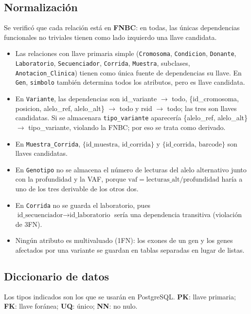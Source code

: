 \documentclass[11pt,a4paper]{article}
\newcommand{\tb}[1]{\texttt{#1}}
\begin{document}
\subsection{Normalización}
\label{sec:normalizacion}

Se verificó que cada relación está en \textbf{FNBC}: en todas, las únicas dependencias funcionales no triviales tienen como lado izquierdo una llave candidata.

\begin{itemize}
  \item Las relaciones con llave primaria simple (\tb{Cromosoma}, \tb{Condicion}, \tb{Donante}, \tb{Laboratorio}, \tb{Secuenciador}, \tb{Corrida}, \tb{Muestra}, subclases, \tb{Anotacion\_Clinica}) tienen como única fuente de dependencias su llave. En \tb{Gen}, \tb{simbolo} también determina todos los atributos, pero es llave candidata.
  \item En \tb{Variante}, las dependencias son id\_variante $\rightarrow$ todo, \{id\_cromosoma, posicion, alelo\_ref, alelo\_alt\} $\rightarrow$ todo y rsid $\rightarrow$ todo; las tres son llaves candidatas. Si se almacenara \tb{tipo\_variante} aparecería \{alelo\_ref, alelo\_alt\} $\rightarrow$ tipo\_variante, violando la FNBC; por eso se trata como derivado.
  \item En \tb{Muestra\_Corrida}, $\{\text{id\_muestra, id\_corrida}\}$ y $\{\text{id\_corrida, barcode}\}$ son llaves candidatas.
  \item En \tb{Genotipo} no se almacena el número de lecturas del alelo alternativo junto con la profundidad y la VAF, porque $\text{vaf} = \text{lecturas\_alt} / \text{profundidad}$ haría a uno de los tres derivable de los otros dos.
  \item En \tb{Corrida} no se guarda el laboratorio, pues $\text{id\_secuenciador} \rightarrow \text{id\_laboratorio}$ sería una dependencia transitiva (violación de 3FN).
  \item Ningún atributo es multivaluado (1FN): los exones de un gen y los genes afectados por una variante se guardan en tablas separadas en lugar de listas.
\end{itemize}

\subsection{Diccionario de datos}

Los tipos indicados son los que se usarán en PostgreSQL. \textbf{PK}: llave primaria; \textbf{FK}: llave foránea; \textbf{UQ}: único; \textbf{NN}: no nulo.
\end{document}
